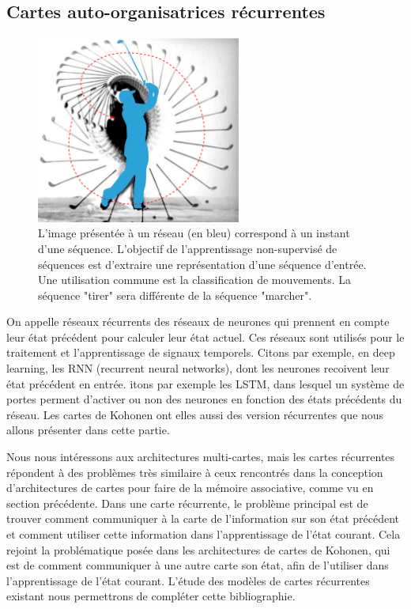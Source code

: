 \documentclass[../main]{subfiles}
\begin{document}
\subsection{Cartes auto-organisatrices récurrentes}
\begin{figure}
   \centering\includegraphics[width=0.6\textwidth]{movment_002.pdf}
   \caption{L'image présentée à un réseau (en bleu) correspond à un instant d'une séquence. L'objectif de l'apprentissage non-supervisé de séquences est d'extraire une représentation d'une séquence d'entrée. Une utilisation commune est la classification de mouvements. La séquence "tirer" sera différente de la séquence "marcher".\label{fig:mouvement}}
\end{figure}

On appelle réseaux récurrents des réseaux de neurones qui prennent en compte leur état précédent pour calculer leur état actuel. Ces réseaux sont utilisés pour le traitement et l'apprentissage de signaux temporels. Citons par exemple, en deep learning, les RNN (recurrent neural networks), dont les neurones recoivent leur état précédent en entrée. itons par exemple les LSTM, dans lesquel un système de portes perment d'activer ou non des neurones en fonction des états précédents du réseau. Les cartes de Kohonen ont elles aussi des version récurrentes que nous allons présenter dans cette partie.

Nous nous intéressons aux architectures multi-cartes, mais les cartes récurrentes répondent à des problèmes très similaire à ceux rencontrés dans la conception d'architectures de cartes pour faire de la mémoire associative, comme vu en section précédente.
Dans une carte récurrente, le problème principal est de trouver comment communiquer à la carte de l'information sur son état précédent et comment utiliser cette information dans l'apprentissage de l'état courant. Cela rejoint la problématique posée dans les architectures de cartes de Kohonen, qui est de comment communiquer à une autre carte son état, afin de l'utiliser dans l'apprentissage de l'état courant. L'étude des modèles de cartes récurrentes existant nous permettrons de compléter cette bibliographie. 
\end{document}
